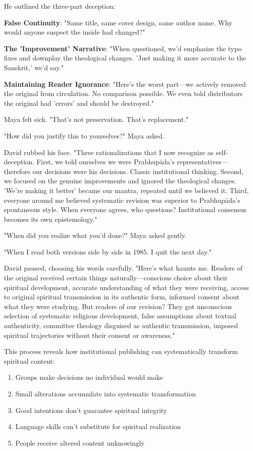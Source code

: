 \documentclass[12pt,twoside]{book}
\begin{document}
He outlined the three-part deception:

\textbf{\textbf{False Continuity}}: "Same title, same cover design, same author name. Why would anyone suspect the inside had changed?"

\textbf{\textbf{The 'Improvement' Narrative}}: "When questioned, we'd emphasize the typo fixes and downplay the theological changes. 'Just making it more accurate to the Sanskrit,' we'd say."

\textbf{\textbf{Maintaining Reader Ignorance}}: "Here's the worst part—we actively removed the original from circulation. No comparison possible. We even told distributors the original had 'errors' and should be destroyed."

Maya felt sick. "That's not preservation. That's replacement."

"How did you justify this to yourselves?" Maya asked.

David rubbed his face. "Three rationalizations that I now recognize as self-deception. First, we told ourselves we were Prabhupāda's representatives—therefore our decisions were his decisions. Classic institutional thinking. Second, we focused on the genuine improvements and ignored the theological changes. 'We're making it better' became our mantra, repeated until we believed it. Third, everyone around me believed systematic revision was superior to Prabhupāda's spontaneous style. When everyone agrees, who questions? Institutional consensus becomes its own epistemology."

"When did you realize what you'd done?" Maya asked gently.

"When I read both versions side by side in 1985. I quit the next day."

David paused, choosing his words carefully. "Here's what haunts me. Readers of the original received certain things naturally—conscious choice about their spiritual development, accurate understanding of what they were receiving, access to original spiritual transmission in its authentic form, informed consent about what they were studying. But readers of our revision? They got unconscious selection of systematic religious development, false assumptions about textual authenticity, committee theology disguised as authentic transmission, imposed spiritual trajectories without their consent or awareness."

This process reveals how institutional publishing can systematically transform spiritual content:

\begin{enumerate}
\item Groups make decisions no individual would make
\item Small alterations accumulate into systematic transformation
\item Good intentions don't guarantee spiritual integrity
\item Language skills can't substitute for spiritual realization
\item People receive altered content unknowingly
\end{enumerate}
\end{document}
